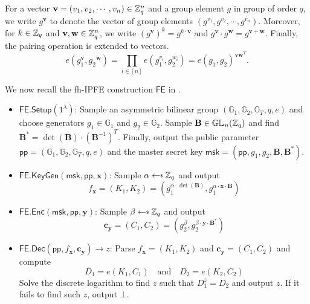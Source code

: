 For a vector $\mathbf{v} = (v_1, v_2, \cdots, v_n) \in \mathbb{Z}_q^n$ and a group element $g$ in group of order $q$, we write $g^\mathbf{v}$ to denote the vector of group elements $(g^{v_1}, g^{v_2}, \cdots, g^{v_n})$. Moreover, for $k \in \mathbb{Z}_q$ and $\mathbf{v}, \mathbf{w} \in \mathbb{Z}_q^n$, we write $(g^{\mathbf{v}})^k = g^{k \cdot \mathbf{v}}$ and $g^\mathbf{v} \cdot g^\mathbf{w} =  g^{\mathbf{v} + \mathbf{w}}$. Finally, the pairing operation is extended to vectors.
\[
	e(g_1^{\mathbf{v}}, g_2{^\mathbf{w}}) = \prod_{i \in [n]} e(g_1^{v_i}, g_2^{w_i}) = e(g_1, g_2)^{\mathbf{v}\mathbf{w}^T}.
\]

We now recall the fh-IPFE construction $\textsf{FE}$ in \cite{cryptoeprint:2016/440}.

\begin{itemize}

	\item $\textsf{FE.Setup}(1^\lambda)$: Sample an asymmetric bilinear group $(\mathbb{G}_1, \mathbb{G}_2, \mathbb{G}_T, q, e)$ and choose generators $g_1 \in \mathbb{G}_1$ and $g_2 \in \mathbb{G}_2$. Sample $\mathbf{B} \in \mathbb{GL}_n(\mathbb{Z}_q)$ and find $\mathbf{B}^* = \det(\mathbf{B}) \cdot (\mathbf{B}^{-1})^T$. Finally, output the public parameter $\textsf{pp} = (\mathbb{G}_1, \mathbb{G}_2, \mathbb{G}_T, q, e)$ and the master secret key $\textsf{msk} = (\textsf{pp}, g_1, g_2, \mathbf{B}, \mathbf{B}^*)$.
	
	\item $\textsf{FE.KeyGen}(\textsf{msk}, \textsf{pp}, \mathbf{x})$: Sample $\alpha \getsdollar \Z_q$ and output
	\[
		 f_\mathbf{x} = (K_1, K_2) = \left( g_1^{\alpha \cdot \det(\mathbf{B})}, g_1^{\alpha \cdot \mathbf{x} \cdot \mathbf{B}} \right)
	\]
	
	\item $\textsf{FE.Enc}(\textsf{msk}, \textsf{pp}, \mathbf{y})$: Sample $\beta \getsdollar \Z_q$ and output
	\[
		 \mathbf{c_y} = (C_1, C_2) = \left( g_2^{\beta}, g_2^{\beta \cdot \mathbf{y} \cdot \mathbf{B}^*} \right)
	\]
	
	\item $\textsf{FE.Dec}(\textsf{pp}, f_\mathbf{x}, \mathbf{c_y}) \to z$: Parse $f_\mathbf{x} = (K_1, K_2)$ and $\mathbf{c_y} = (C_1, C_2)$ and compute 
	\[
		D_1 = e(K_1, C_1) \quad \text{and} \quad D_2 = e(K_2, C_2)
	\]
	Solve the discrete logarithm to find $z$ such that $D_1^z = D_2$ and output $z$. If it fails to find such $z$, output $\bot$.

\end{itemize}

